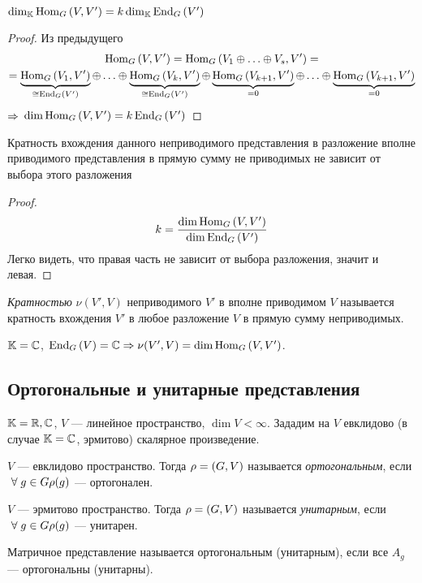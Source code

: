 \begin{stm}
	$
		\dim_{\mathbb{K}}\operatorname{Hom}_G\left(V, V'\right) = k \dim_{\mathbb{K}}\operatorname{End}_G\left(V'\right)
	$
\end{stm}
\begin{proof}
	Из предыдущего
	\begin{gather*}
		\Hom_G\hr{V, V'} = \Hom_G\hr{V_1 \sop V_s, V'} = \\
		= \ub{\Hom_G\hr{V_1, V'}}_{\cong\End_G\hr{V'}} \sop \ub{\Hom_G\hr{V_k, V'}}_{\cong\End_G\hr{V'}} \oplus
		\ub{\Hom_G\hr{V_{k + 1}, V'}}_{=0} \sop \ub{\Hom_G\hr{V_{k + 1}, V'}}_{=0}
	\end{gather*}
	$\Rightarrow$ $\dim \operatorname{Hom}_G \left(V, V'\right) = k \operatorname{End}_G\left(V'\right)$
\end{proof}
\begin{theorem}
	Кратность вхождения данного неприводимого представления
	в разложение вполне приводимого представления в прямую
	сумму не приводимых не зависит от выбора этого разложения
\end{theorem}
\begin{proof}
	$$
		k = \frac{\dim\operatorname{Hom}_G\left(V, V'\right)}{\dim\operatorname{End}_G\left(V'\right)}
	$$
	Легко видеть, что правая часть не зависит от выбора разложения, значит и левая.
\end{proof}
\begin{df}
	\textit{Кратностью} $\nu(V', V)$ неприводимого $V'$ в вполне приводимом $V$ называется
	кратность вхождения $V'$ в любое разложение $V$ в прямую сумму неприводимых.
\end{df}
\begin{imp}
	$\mathbb{K} = \mathbb{C}$, $\operatorname{End}_G\left(V\right) = \mathbb{C} \Rightarrow \nu(V', V) = \dim\operatorname{Hom}_G\left(V, V'\right)$.
\end{imp}


\subsection{Ортогональные и унитарные представления}
$\mathbb{K} = \mathbb{R}, \mathbb{C}$, $V$ --- линейное пространство, $\dim V < \infty$.
Зададим на $V$ евклидово (в случае $\mathbb{K} = \mathbb{C}$, эрмитово) скалярное произведение.
\begin{df}
	$V$ --- евклидово пространство.
	Тогда $\rho = \left(G, V\right)$ называется \textit{ортогональным}, если
	$~\forall\; g \in G \rho(g)$ --- ортогонален.

	$V$ --- эрмитово пространство.
	Тогда $\rho = \left(G, V\right)$ называется \textit{унитарным}, если
	$~\forall\; g \in G \rho(g)$ --- унитарен.

	Матричное представление называется ортогональным (унитарным),
	если все $A_g$ --- ортогональны (унитарны).
\end{df}


